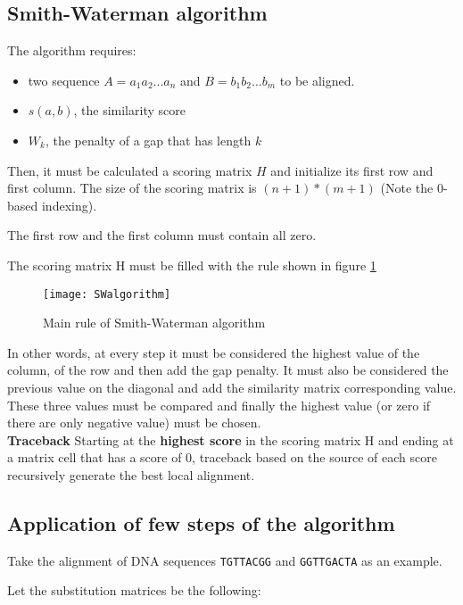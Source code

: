 \subsection{Smith-Waterman algorithm}

The algorithm requires:

\begin{itemize}
  \item two sequence $A = a_{1}a_{2}...a_{n}$ and $B = b_{1}b_{2}...b_{m}$ to
be aligned.
  \item $s(a,b)$, the similarity score
  \item $W_k$, the penalty of a gap that has length $k$
\end{itemize}

Then, it must be calculated a scoring matrix $H$ and initialize its first
row and first column.
The size of the scoring matrix is $(n + 1)*(m + 1)$ (Note the 0-based
indexing).

The first row and the first column must contain all zero.

The scoring matrix H must be filled with the rule shown in figure
\ref{fig:swalgorithm}

\begin{figure}[H]
  \centering
  \texttt{[image: SWalgorithm]}
  \caption{Main rule of Smith-Waterman algorithm}
  \label{fig:swalgorithm}
\end{figure}

In other words, at every step it must be considered the highest value
of the column, of the row and then add the gap penalty. It must also
be considered the previous value on the diagonal and add the
similarity matrix corresponding value. These three values must be
compared and finally the highest value (or zero if there are only
negative value) must be chosen. \\

\textbf{Traceback}
Starting at the \textbf{highest score} in the scoring matrix H and ending at a
matrix cell that has a score of 0, traceback based on the source of
each score recursively generate the best local alignment.

\subsection{Application of few steps of the algorithm}

Take the alignment of DNA sequences \texttt{TGTTACGG} and
\texttt{GGTTGACTA} as an example.

Let the substitution matrices be the following:

